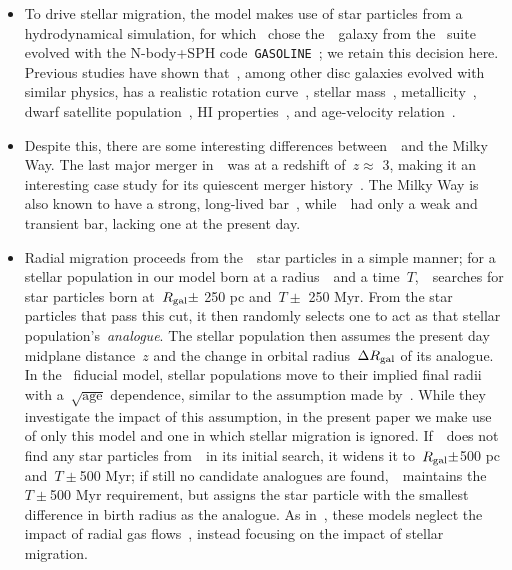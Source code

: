 \documentclass[ms.tex]{subfiles}
\begin{document}
\begin{itemize}
	\item To drive stellar migration, the model makes use of star particles 
	from a hydrodynamical simulation, for which~\citet{Johnson2021} chose 
	the~\hsim~galaxy from the~\citet{Christensen2012} suite evolved with the 
	N-body+SPH code~\texttt{GASOLINE}~\citep{Wadsley2004}; we retain this 
	decision here. 
	Previous studies have shown that~\hsim, among other disc galaxies evolved 
	with similar physics, has a realistic rotation curve~\citep{Governato2012, 
	Christensen2014a, Christensen2014b}, stellar mass~\citep{Munshi2013}, 
	metallicity~\citep{Christensen2016}, dwarf satellite 
	population~\citep{Zolotov2012,Brooks2014}, HI properties~\citep{Brooks2017}, 
	and age-velocity relation~\citep{Bird2021}. 

	\item Despite this, there are some interesting differences 
	between~\hsim~and the Milky Way. 
	The last major merger in~\hsim~was at a redshift of~$z \approx$ 3, making 
	it an interesting case study for its quiescent merger 
	history~\citep[e.g.][]{Zolotov2012}. 
	The Milky Way is also known to have a strong, long-lived 
	bar~\citep[e.g.][]{Bovy2019}, while~\hsim~had only a weak and transient 
	bar, lacking one at the present day. 

	\item Radial migration proceeds from the~\hsim~star particles in a simple 
	manner; for a stellar population in our model born at a radius~\rgal~and a 
	time~$T$,~\vice~searches for star particles born at~$R_\text{gal} \pm$ 250 pc 
	and~$T \pm$ 250 Myr. 
	From the star particles that pass this cut, it then randomly selects one 
	to act as that stellar population's~\textit{analogue}. 
	The stellar population then assumes the present day midplane distance~$z$ 
	and the change in orbital radius~$\Delta R_\text{gal}$ of its analogue. 
	In the~\citet{Johnson2021} fiducial model, stellar populations move to 
	their implied final radii with a~$\sqrt{\text{age}}$ dependence, similar 
	to the assumption made by~\citet{Frankel2018, Frankel2019}. 
	While they investigate the impact of this assumption, in the present paper 
	we make use of only this model and one in which stellar migration is 
	ignored. 
	If~\vice~does not find any star particles from~\hsim~in its initial search, 
	it widens it to~$R_\text{gal} \pm$500 pc and~$T \pm$500 Myr; if still no 
	candidate analogues are found,~\vice~maintains the~$T \pm$500 Myr 
	requirement, but assigns the star particle with the smallest difference in 
	birth radius as the analogue. 
	As in~\citet{Johnson2021}, these models neglect the impact of radial 
	gas flows~\citep[e.g.][]{Lacey1985, Bilitewski2012, Vincenzo2020}, instead 
	focusing on the impact of stellar migration. 


\end{itemize}
\end{document}
